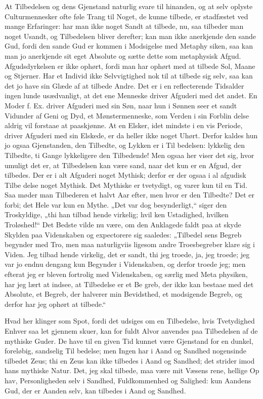 \documentclass[12pt]{book}
\newcommand{\opage}[1]{\marginnote{\footnotesize\textit{[#1]}}}
\begin{document}
At Tilbedelsen og dens Gjenstand naturlig svare til
hinanden, og at selv oplyste Culturmennesker ofte føle
Trang til Noget, de kunne tilbede, er stadfæstet ved
mange Erfaringer: har man ikke noget Sandt at tilbede,
nu, saa tilbeder man noget Usandt, og Tilbedelsen bliver
\opage{116}\setcounter{footnote}{0}%
derefter; kan man ikke anerkjende den sande Gud, fordi
den sande Gud er kommen i Modsigelse med Metaphy\-%
siken, saa kan man jo anerkjende sit eget Absolute og sætte
dette som metaphysisk Afgud. Afgudsdyrkelsen er ikke
ophørt, fordi man har ophørt med at tilbede Sol, Maane
og Stjerner. Har et Individ ikke Selvvigtighed nok til
at tilbede sig selv, saa kan det jo have sin Glæde af at
tilbede Andre. Det er i en reflecterende Tidsalder ingen\-%
lunde usædvanligt, at det ene Menneske driver Afguderi
med det andet. En Moder f. Ex. driver Afguderi med
sin Søn, naar hun i Sønnen seer et sandt Vidunder af Geni
og Dyd, et Mønstermenneske, som Verden i sin Forblin\-%
delse aldrig vil forstaae at paaskjønne. At en Elsker, idet\-%
mindste i en vis Periode, driver Afguderi med sin Elskede,
er da heller ikke noget Uhørt. Derfor kaldes hun jo
ogsaa Gjenstanden, den Tilbedte, og Lykken er i Til\-%
bedelsen: lykkelig den Tilbedte, ti Gange lykkeligere
den Tilbedende! Men ogsaa her viser det sig, hvor
umuligt det er, at Tilbedelsen kan være sand, naar det
kun er en Afgud, der tilbedes. Der er i alt Afguderi
noget Mythisk; derfor er der ogsaa i al afgudisk Tilbe\-%
delse noget Mythisk. Det Mythiske er tvetydigt, og varer
kun til en Tid. Saa møder man Tilbederen et halvt
Aar efter, men hvor er den Tilbedte? Det er forbi;
det Hele var kun en Mythe. „Det var dog besynderligt,“
siger den Troskyldige, „thi han tilbad hende virkelig; hvil\-%
ken Ustadighed, hvilken Troløshed!“ Det Bedste vilde
nu være, om den Anklagede faldt paa at skyde Skylden
paa Videnskaben og expectorere sig saaledes: „Tilbedel\-%
sens Begreb begynder med Tro, men maa naturligviis
ligesom andre Troesbegreber klare sig i Viden. Jeg
tilbad hende virkelig, det er sandt, thi jeg troede, ja, jeg
troede; jeg var jo endnu dengang kun Begynder i
Videnskaben, og derfor troede jeg; men efterat jeg er
\opage{117}\setcounter{footnote}{0}%
bleven fortrolig med Videnskaben, og særlig med Meta\-%
physiken, har jeg lært at indsee, at Tilbedelse er et Be\-%
greb, der ikke kan bestaae med det Absolute, et Begreb,
der halverer min Bevidsthed, et modsigende Begreb, og
derfor har jeg ophørt at tilbede.“

Hvad her klinger som Spot, fordi det udsiges om
en Tilbedelse, hvis Tvetydighed Enhver saa let gjennem\-%
skuer, kan for fuldt Alvor anvendes paa Tilbedelsen af
de mythiske Guder. De have til en given Tid kunnet
være Gjenstand for en dunkel, foreløbig, sandselig Til\-%
bedelse; men Ingen har i Aand og Sandhed nogensinde
tilbedet Zeus; thi en Zeus kan ikke tilbedes i Aand og
Sandhed; det strider imod hans mythiske Natur. Det,
jeg skal tilbede, maa være mit Væsens rene, hellige Op\-%
hav, Personligheden selv i Sandhed, Fuldkommenhed og
Salighed: kun Aandens Gud, der er Aanden selv, kan
tilbedes i Aand og Sandhed.
\end{document}
